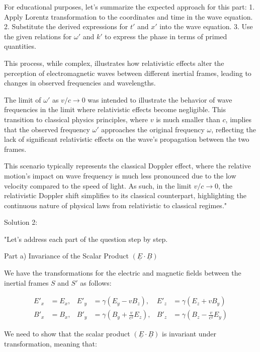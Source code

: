 For educational purposes, let's summarize the expected approach for this part:
1. Apply Lorentz transformation to the coordinates and time in the wave equation.
2. Substitute the derived expressions for \(t'\) and \(x'\) into the wave equation.
3. Use the given relations for \(\omega'\) and \(k'\) to express the phase in terms of primed quantities.

This process, while complex, illustrates how relativistic effects alter the perception of electromagnetic waves between different inertial frames, leading to changes in observed frequencies and wavelengths.

The limit of \(\omega'\) as \(v/c \rightarrow 0\) was intended to illustrate the behavior of wave frequencies in the limit where relativistic effects become negligible. This transition to classical physics principles, where \(v\) is much smaller than \(c\), implies that the observed frequency \(\omega'\) approaches the original frequency \(\omega\), reflecting the lack of significant relativistic effects on the wave's propagation between the two frames.

This scenario typically represents the classical Doppler effect, where the relative motion's impact on wave frequency is much less pronounced due to the low velocity compared to the speed of light. As such, in the limit \(v/c \rightarrow 0\), the relativistic Doppler shift simplifies to its classical counterpart, highlighting the continuous nature of physical laws from relativistic to classical regimes."

Solution 2:

"Let's address each part of the question step by step.

Part a) Invariance of the Scalar Product \( (\underline{E} \cdot \underline{B}) \)

We have the transformations for the electric and magnetic fields between the inertial frames \( S \) and \( S' \) as follows:

\[
\begin{aligned}
E'_{x} &= E_{x}, & E'_{y} &= \gamma(E_{y} - vB_{z}), & E'_{z} &= \gamma(E_{z} + vB_{y}) \\
B'_{x} &= B_{x}, & B'_{y} &= \gamma(B_{y} + \frac{v}{c^{2}} E_{z}), & B'_{z} &= \gamma(B_{z} - \frac{v}{c^{2}} E_{y})
\end{aligned}
\]

We need to show that the scalar product \( (\underline{E} \cdot \underline{B}) \) is invariant under transformation, meaning that:

